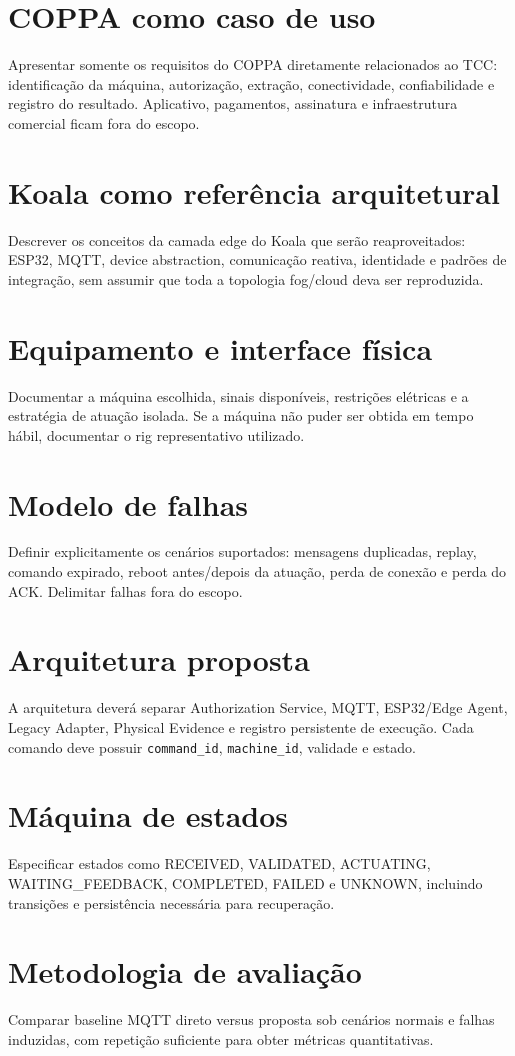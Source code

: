 \section{COPPA como caso de uso}
Apresentar somente os requisitos do COPPA diretamente relacionados ao TCC: identificação da máquina, autorização, extração, conectividade, confiabilidade e registro do resultado. Aplicativo, pagamentos, assinatura e infraestrutura comercial ficam fora do escopo.

\section{Koala como referência arquitetural}
Descrever os conceitos da camada edge do Koala que serão reaproveitados: ESP32, MQTT, device abstraction, comunicação reativa, identidade e padrões de integração, sem assumir que toda a topologia fog/cloud deva ser reproduzida.

\section{Equipamento e interface física}
Documentar a máquina escolhida, sinais disponíveis, restrições elétricas e a estratégia de atuação isolada. Se a máquina não puder ser obtida em tempo hábil, documentar o rig representativo utilizado.

\section{Modelo de falhas}
Definir explicitamente os cenários suportados: mensagens duplicadas, replay, comando expirado, reboot antes/depois da atuação, perda de conexão e perda do ACK. Delimitar falhas fora do escopo.

\section{Arquitetura proposta}
A arquitetura deverá separar Authorization Service, MQTT, ESP32/Edge Agent, Legacy Adapter, Physical Evidence e registro persistente de execução. Cada comando deve possuir \texttt{command\_id}, \texttt{machine\_id}, validade e estado.

\section{Máquina de estados}
Especificar estados como RECEIVED, VALIDATED, ACTUATING, WAITING\_FEEDBACK, COMPLETED, FAILED e UNKNOWN, incluindo transições e persistência necessária para recuperação.

\section{Metodologia de avaliação}
Comparar baseline MQTT direto versus proposta sob cenários normais e falhas induzidas, com repetição suficiente para obter métricas quantitativas.
